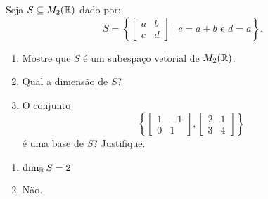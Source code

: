 \documentclass[12pt]{exam}
\begin{document}
    \begin{exercicio}
        Seja $S \subseteq M_2(\mathbb{R})$ dado por:
        \[
            S = \left\{
                \begin{bmatrix}
                    a & b\\
                    c & d
                \end{bmatrix}
                \mid c = a+b \mbox{ e } d = a
            \right\}.
        \]

        \begin{enumerate}[label={\alph*})]
            \item Mostre que $S$ \'e um subespa\c{c}o vetorial de $M_2(\mathbb{R})$.

            \item Qual a dimens\~ao de $S$?

            \item O conjunto
                \[
                    \left\{
                        \begin{bmatrix}
                            1 & -1\\
                            0 & 1
                        \end{bmatrix},
                        \begin{bmatrix}
                            2 & 1\\
                            3 & 4
                        \end{bmatrix}
                    \right\}
                \]
                \'e uma base de $S$? Justifique.
        \end{enumerate}

        \begin{solucao}
            \begin{enumerate}[label={\alph*})]
                \item $\dim_{\mathbb{R}} S = 2$

                \item N\~ao.
            \end{enumerate}
        \end{solucao}
    \end{exercicio}
\end{document}

